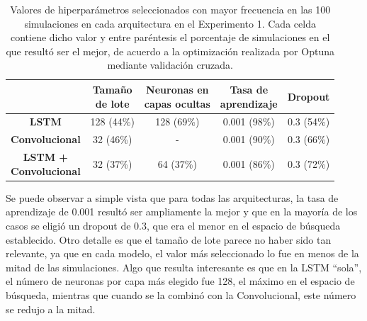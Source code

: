 \documentclass[../../main.tex]{subfiles}
\begin{document}
\begin{table}[H]
    \centering
    \renewcommand{\arraystretch}{1.2}
    \begin{tabular}{|c|c|c|c|c|}
        \hline
            & \makecell{\textbf{Tamaño}\\\textbf{de lote}}
            & \makecell{\textbf{Neuronas en}\\\textbf{capas ocultas}}
            & \makecell{\textbf{Tasa de}\\\textbf{aprendizaje}}
            & \textbf{Dropout} \\ \hline\hline
        \textbf{LSTM}
            & 128 (44\%) & 128 (69\%) & 0.001 (98\%) & 0.3 (54\%) \\ \hline
        \textbf{Convolucional}
            & 32 (46\%)  & -          & 0.001 (90\%) & 0.3 (66\%) \\ \hline
        \makecell{\textbf{LSTM +}\\\textbf{Convolucional}}
            & 32 (37\%)  & 64 (37\%)  & 0.001 (86\%) & 0.3 (72\%) \\
        \hline
    \end{tabular}
    \caption{Valores de hiperparámetros seleccionados con mayor frecuencia en las 100
    simulaciones en cada arquitectura en el Experimento 1. Cada celda contiene dicho valor
    y entre paréntesis el porcentaje de simulaciones en el que resultó ser el mejor, de
    acuerdo a la optimización realizada por Optuna mediante validación cruzada.}
    \label{tab:hyperparams_exp1}
\end{table}

Se puede observar a simple vista que para todas las arquitecturas, la tasa de aprendizaje
de 0.001 resultó ser ampliamente la mejor y que en la mayoría de los casos se eligió un
dropout de 0.3, que era el menor en el espacio de búsqueda establecido. Otro detalle
es que el tamaño de lote parece no haber sido tan relevante, ya que en cada modelo, el
valor más seleccionado lo fue en menos de la mitad de las simulaciones. Algo que resulta
interesante es que en la LSTM ``sola'', el número de neuronas por capa más elegido fue
128, el máximo en el espacio de búsqueda, mientras que cuando se la combinó con la
Convolucional, este número se redujo a la mitad.
\end{document}
